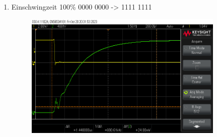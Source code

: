 {\begin{enumerate}[label=\Alph*.]
\begin{figure}[H]
	\end{figure}
	\item Einschwingzeit 100\% 0000 0000 -> 1111 1111
	\begin{figure}[H]
		\centering
		\includegraphics[height=6cm]{images/einschwingszeit00000000-11111111_100proz.png} 
	\end{figure}
\end{enumerate}
}
